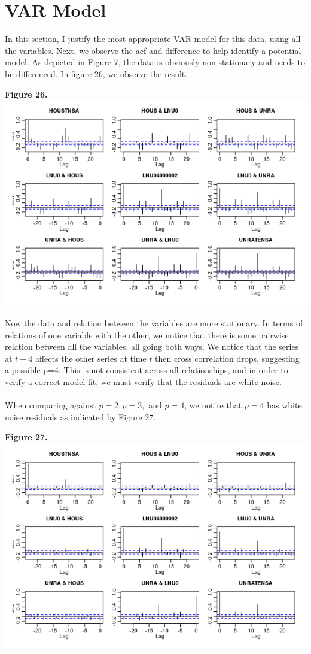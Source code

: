 \documentclass[11pt]{article}
\begin{document}
\section{VAR Model}
In this section, I justify the most appropriate VAR model for this data, using all the variables. Next, we observe the acf and difference to help identify a potential model. As depicted in Figure 7, the data is obviously non-stationary and needs to be differenced. In figure 26, we observe the result.
\begin{center}
\textbf{Figure 26.}
\\
\includegraphics[scale=1]{diff}
\end{center}
Now the data and relation between the variables are more stationary. In terms of relations of one variable with the other, we notice that there is some pairwise relation between all the variables, all going both ways. We notice that the series at $t-4$ affects the other series at time $t$ then cross correlation drops, suggesting a possible p=4. This is not consistent across all relationships, and in order to verify a correct model fit, we must verify that the residuals are white noise.
\\\\
When comparing against $p=2, p=3,$ and $p=4$, we notice that $p=4$ has white noise residuals as indicated by Figure 27.
\begin{center}
\textbf{Figure 27.}
\\
\includegraphics[scale=1]{witno}
\end{center}
\end{document}
